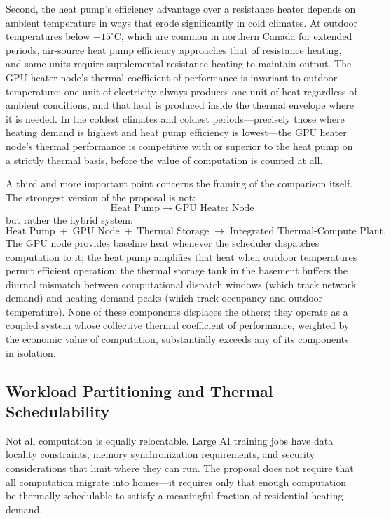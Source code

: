 \documentclass[12pt, oneside]{article}
\begin{document}
Second, the heat pump's efficiency advantage over a resistance heater depends on ambient temperature in ways that erode significantly in cold climates. At outdoor temperatures below $-15^{\circ}$C, which are common in northern Canada for extended periods, air-source heat pump efficiency approaches that of resistance heating, and some units require supplemental resistance heating to maintain output. The GPU heater node's thermal coefficient of performance is invariant to outdoor temperature: one unit of electricity always produces one unit of heat regardless of ambient conditions, and that heat is produced inside the thermal envelope where it is needed. In the coldest climates and coldest periods---precisely those where heating demand is highest and heat pump efficiency is lowest---the GPU heater node's thermal performance is competitive with or superior to the heat pump on a strictly thermal basis, before the value of computation is counted at all.

A third and more important point concerns the framing of the comparison itself. The strongest version of the proposal is not:
\[
\text{Heat Pump} \;\rightarrow\; \text{GPU Heater Node}
\]
but rather the hybrid system:
\[
\text{Heat Pump} \;+\; \text{GPU Node} \;+\; \text{Thermal Storage} \;\rightarrow\; \text{Integrated Thermal-Compute Plant}.
\]
The GPU node provides baseline heat whenever the scheduler dispatches computation to it; the heat pump amplifies that heat when outdoor temperatures permit efficient operation; the thermal storage tank in the basement buffers the diurnal mismatch between computational dispatch windows (which track network demand) and heating demand peaks (which track occupancy and outdoor temperature). None of these components displaces the others; they operate as a coupled system whose collective thermal coefficient of performance, weighted by the economic value of computation, substantially exceeds any of its components in isolation.

\subsection{Workload Partitioning and Thermal Schedulability}

Not all computation is equally relocatable. Large AI training jobs have data locality constraints, memory synchronization requirements, and security considerations that limit where they can run. The proposal does not require that all computation migrate into homes---it requires only that enough computation be thermally schedulable to satisfy a meaningful fraction of residential heating demand.
\end{document}
